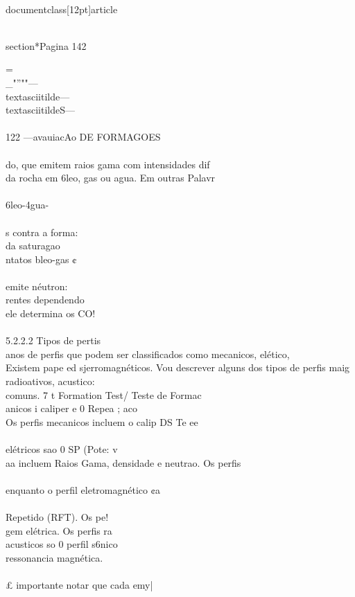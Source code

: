 \\documentclass[12pt]{article}
\begin{document}
\\section*{Pagina 142}

=\\_"”""—\\textasciitilde{}—\\textasciitilde{}S—\\
\\
122 —avauiacAo DE FORMAGOES\\
\\
do, que emitem raios gama com intensidades dif\\
da rocha em 6leo, gas ou agua. Em outras Palavr\\
\\
6leo-4gua-\\
\\
s contra a forma:\\
da saturagao\\
ntatos bleo-gas ¢\\
\\
emite néutron:\\
rentes dependendo\\
ele determina os CO!\\
\\
5.2.2.2 Tipos de pertis\\
anos de perfis que podem ser classificados como mecanicos, elético,\\
Existem pape ed sjerromagnéticos. Vou descrever alguns dos tipos de perfis maig\\
radioativos, acustico:\\
comuns. 7 t Formation Test/ Teste de Formac\\
anicos i caliper e 0 Repea ; aco\\
Os perfis mecanicos incluem o calip DS Te ee\\
\\
elétricos sao 0 SP (Pote: v\\
aa incluem Raios Gama, densidade e neutrao. Os perfis\\
\\
enquanto o perfil eletromagnético ¢a\\
\\
Repetido (RFT). Os pe!\\
gem elétrica. Os perfis ra\\
acusticos so 0 perfil s6nico\\
ressonancia magnética.\\
\\
£ importante notar que cada emy|\\
\end{document}
